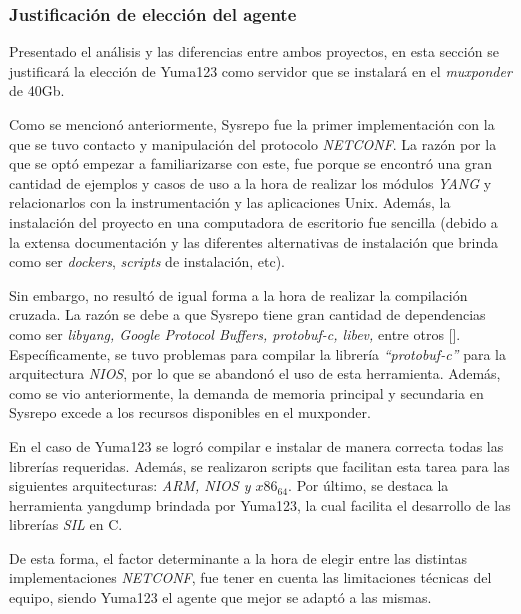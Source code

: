 	\subsubsection{Justificación de elección del agente}

	Presentado el análisis y las diferencias entre ambos proyectos, en esta sección se justificará la elección de Yuma123 como servidor que se instalará en el \textit{muxponder} de 40Gb.

Como se mencionó anteriormente, Sysrepo fue la primer implementación con la que se tuvo contacto y manipulación del protocolo \textit{NETCONF}. La razón por la que se optó empezar a familiarizarse con este, fue porque se encontró una gran cantidad de ejemplos y casos de uso a la hora de realizar los módulos \textit{YANG} y relacionarlos con la instrumentación y las aplicaciones Unix. Además, la instalación del proyecto en una computadora de escritorio fue sencilla (debido a la extensa documentación y las diferentes alternativas de instalación que brinda como ser \textit{dockers}, \textit{scripts} de instalación, etc).

Sin embargo, no resultó de igual forma a la hora de realizar la compilación cruzada. La razón se debe a que Sysrepo tiene gran cantidad de dependencias como ser \textit{libyang, Google Protocol Buffers, protobuf-c, libev,} entre otros []. Específicamente, se tuvo problemas para compilar la librería \textit{“protobuf-c”} para la arquitectura \textit{NIOS}, por lo que se abandonó el uso de esta herramienta. Además, como se vio anteriormente, la demanda de memoria principal y secundaria en Sysrepo excede a los recursos disponibles en el muxponder.

En el caso de Yuma123 se logró compilar e instalar de manera correcta todas las librerías requeridas. Además, se realizaron scripts que facilitan esta tarea para las siguientes arquitecturas: \textit{ARM, NIOS y $x86_64$}. Por último, se destaca la herramienta yangdump brindada por Yuma123, la cual facilita el desarrollo de las librerías \textit{SIL} en C.

De esta forma, el factor determinante a la hora de elegir entre las distintas implementaciones \textit{NETCONF}, fue tener en cuenta las limitaciones técnicas del equipo, siendo Yuma123 el agente que mejor se adaptó a las mismas. 

